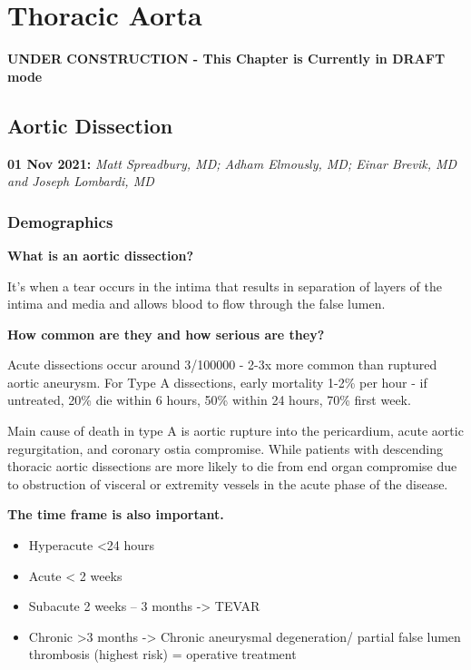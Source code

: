 \documentclass[
]{book}
\begin{document}
\hypertarget{thoracic-aorta}{%
\chapter{Thoracic Aorta}\label{thoracic-aorta}}

\textbf{UNDER CONSTRUCTION - This Chapter is Currently in DRAFT mode}

\hypertarget{aortic-dissection}{%
\section{Aortic Dissection}\label{aortic-dissection}}

\textbf{01 Nov 2021:} \emph{Matt Spreadbury, MD; Adham Elmously, MD; Einar Brevik,
MD and Joseph Lombardi, MD}

\hypertarget{demographics-4}{%
\subsection{Demographics}\label{demographics-4}}

\textbf{What is an aortic dissection?}

It's when a tear occurs in the intima that results in separation of
layers of the intima and media and allows blood to flow through the
false lumen.

\textbf{How common are they and how serious are they?}

Acute dissections occur around 3/100000 - 2-3x more common than ruptured
aortic aneurysm. For Type A dissections, early mortality 1-2\% per hour -
if untreated, 20\% die within 6 hours, 50\% within 24 hours, 70\% first
week.

Main cause of death in type A is aortic rupture into the pericardium,
acute aortic regurgitation, and coronary ostia compromise. While
patients with descending thoracic aortic dissections are more likely to
die from end organ compromise due to obstruction of visceral or
extremity vessels in the acute phase of the disease.

\textbf{The time frame is also important.}

\begin{itemize}
\item
  Hyperacute \textless24 hours
\item
  Acute \textless{} 2 weeks
\item
  Subacute 2 weeks -- 3 months -\textgreater{} TEVAR
\item
  Chronic \textgreater3 months -\textgreater{} Chronic aneurysmal degeneration/ partial
  false lumen thrombosis (highest risk) = operative treatment
\end{itemize}
\end{document}
